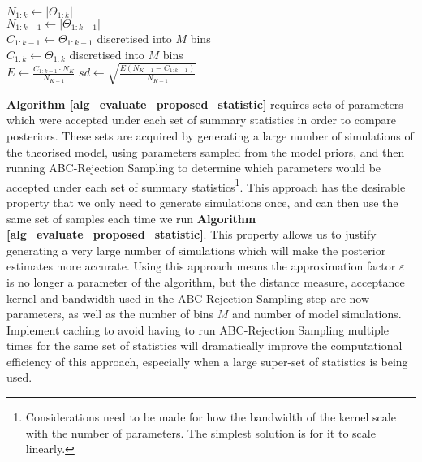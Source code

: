 \documentclass[bibliography=totoc,11pt,a4paper,margin=0]{article}
\theoremstyle{break}
\begin{document}
  \begin{box_algorithm}\label{alg_evaluate_proposed_statistic}
    \begin{algorithm}[H]
      $N_{1:k}\leftarrow\left|\Theta_{1:k}\right|$\\
      $N_{1:k-1}\leftarrow\left|\Theta_{1:k-1}\right|$\\
      $C_{1:k-1}\leftarrow\Theta_{1:k-1}$ discretised into $M$ bins\\
      $C_{1:k}\leftarrow\Theta_{1:k}$ discretised into $M$ bins\\
      $E\leftarrow\displaystyle\frac{C_{1:k-1}\cdot N_K}{N_{K-1}}$\label{alg_expected_value}
      $sd\leftarrow\displaystyle\sqrt{\frac{E(N_{K-1}-C_{1:k-1})}{N_{K-1}}}$\label{alg_standard_deviation}
       { \label{alg_line_condition}
      } 
    \end{algorithm}
  \end{box_algorithm}

  \par \textbf{Algorithm \ref{alg_evaluate_proposed_statistic}} requires sets of parameters which were accepted under each set of summary statistics in order to compare posteriors. These sets are acquired by generating a large number of simulations of the theorised model, using parameters sampled from the model priors, and then running ABC-Rejection Sampling to determine which parameters would be accepted under each set of summary statistics\footnote{Considerations need to be made for how the bandwidth of the kernel scale with the number of parameters. The simplest solution is for it to scale linearly.}. This approach has the desirable property that we only need to generate simulations once, and can then use the same set of samples each time we run \textbf{Algorithm \ref{alg_evaluate_proposed_statistic}}. This property allows us to justify generating a very large number of simulations which will make the posterior estimates more accurate. Using this approach means the approximation factor $\varepsilon$ is no longer a parameter of the algorithm, but the distance measure, acceptance kernel and bandwidth used in the ABC-Rejection Sampling step are now parameters, as well as the number of bins $M$ and number of model simulations. Implement caching to avoid having to run ABC-Rejection Sampling multiple times for the same set of statistics will dramatically improve the computational efficiency of this approach, especially when a large super-set of statistics is being used.
\end{document}
